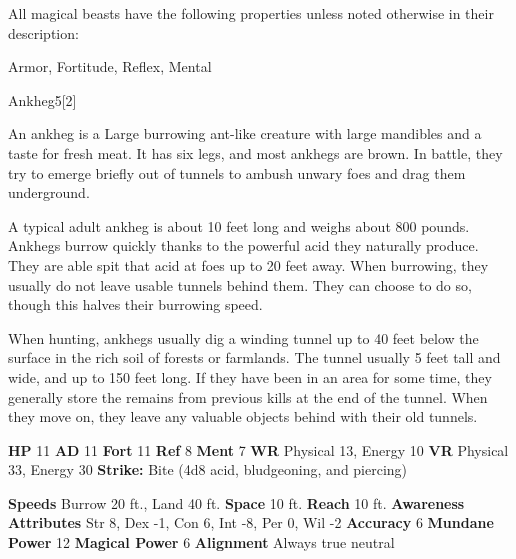         All magical beasts have the following properties unless noted otherwise in their description:
        
    
     Armor,
     Fortitude,
     Reflex,
     Mental
  
  
      
  \begin{monsection}{Ankheg}{5}[2]
    \vspace{-1em}\vspace{-1em}
    \vspace{0em}

    
        An ankheg is a Large burrowing ant-like creature with large mandibles and a taste for fresh meat.
        It has six legs, and most ankhegs are brown.
        In battle, they try to emerge briefly out of tunnels to ambush unwary foes and drag them underground.
      
        A typical adult ankheg is about 10 feet long and weighs about 800 pounds.
        Ankhegs burrow quickly thanks to the powerful acid they naturally produce.
        They are able spit that acid at foes up to 20 feet away.
        When burrowing, they usually do not leave usable tunnels behind them.
        They can choose to do so, though this halves their burrowing speed.
      
        When hunting, ankhegs usually dig a winding tunnel up to 40 feet below the surface in the rich soil of forests or farmlands.
        The tunnel usually 5 feet tall and wide, and up to 150 feet long.
        If they have been in an area for some time, they generally store the remains from previous kills at the end of the tunnel.
        When they move on, they leave any valuable objects behind with their old tunnels.
      

    \begin{spellcontent}
      \begin{spelltargetinginfo}
        \pari \textbf{HP} 11 \monsep
          \textbf{AD} 11 \monsep
          \textbf{Fort} 11 \monsep
          \textbf{Ref} 8 \monsep
          \textbf{Ment} 7
        \pari \textbf{WR} Physical 13, Energy 10 \monsep
        \textbf{VR} Physical 33, Energy 30
        \pari \textbf{Strike:}
            Bite  (4d8 acid, bludgeoning, and piercing)
      \end{spelltargetinginfo}
    \end{spellcontent}
    \begin{monsterfooter}
      \pari \textbf{Speeds} Burrow 20 ft., Land 40 ft. \monsep
        \textbf{Space} 10 ft. \monsep
        \textbf{Reach} 10 ft.
      \pari \textbf{Awareness} 
      \pari \textbf{Attributes}
        Str 8, Dex -1,
        Con 6, Int -8,
        Per 0, Wil -2
      \pari \textbf{Accuracy} 6 \monsep
        \textbf{Mundane Power} 12 \monsep
      \textbf{Magical Power} 6
      \pari \textbf{Alignment} Always true neutral
    \end{monsterfooter}
  \end{monsection}
